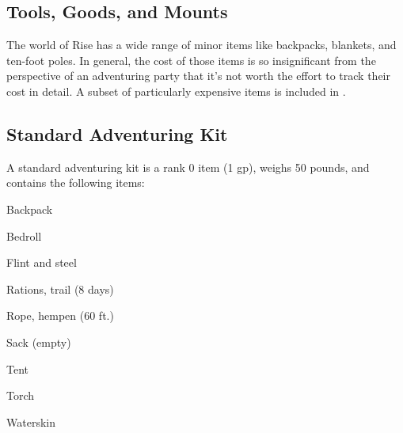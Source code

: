   \begin{longcolumn}
    \section{Tools, Goods, and Mounts}
      \begin{longtablepreface}

        The world of Rise has a wide range of minor items like backpacks, blankets, and ten-foot poles.
        In general, the cost of those items is so insignificant from the perspective of an adventuring party that it's not worth the effort to track their cost in detail.
        A subset of particularly expensive items is included in .

        \subsection{Standard Adventuring Kit}\label{Standard Adventuring Kit}
          A standard adventuring kit is a rank 0 item (1 gp), weighs 50 pounds, and contains the following items:
          \begin{raggeditemize}
            \item Backpack
            \item Bedroll
            \item Flint and steel
            \item Rations, trail (8 days)
            \item Rope, hempen (60 ft.)
            \item Sack (empty)
            \item Tent
            \item Torch
            \item Waterskin
          \end{raggeditemize}
      \end{longtablepreface}

      
  \end{longcolumn}

  


